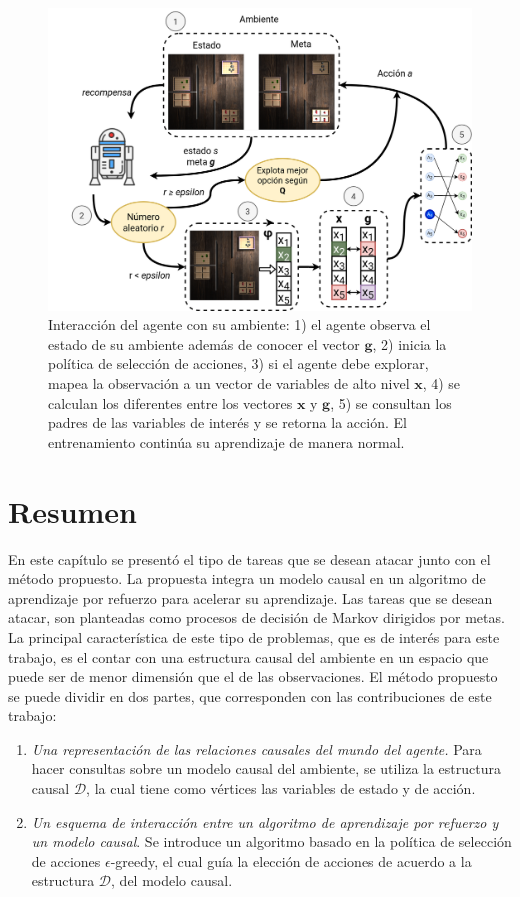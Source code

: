  \begin{figure}
     \centering
     \includegraphics[scale=0.25]{Chapter4/Figs/example_method.png}
     \caption{Interacción del agente con su ambiente: 1) el agente observa el estado de su ambiente además de conocer el vector $\mathbf{g}$, 2) inicia
     la política de selección de acciones, 3) si el agente debe explorar, mapea la observación a un vector de variables de alto nivel $\mathbf{x}$, 4) se calculan los diferentes entre los vectores $\mathbf{x}$ y $\mathbf{g}$, 5) se consultan los padres de las variables de interés y se retorna la acción. El entrenamiento continúa su aprendizaje de manera normal.}
     \label{fig:example-switches}
 \end{figure}
 
 \clearpage
 \section{Resumen}
 
En este capítulo se presentó el tipo de tareas que se 
desean atacar junto con el método propuesto. La propuesta
integra un modelo causal en un algoritmo de aprendizaje por refuerzo para
acelerar su aprendizaje.
Las tareas que se desean atacar, son 
planteadas como procesos de decisión de Markov dirigidos por metas.
La principal característica de este tipo de problemas, que es de interés para este trabajo,
es el contar con una estructura causal del ambiente en un espacio 
que puede ser de menor dimensión que el de las observaciones.
El método propuesto se puede dividir en dos partes, que
corresponden con las contribuciones de este trabajo:

\begin{enumerate}
    \item \textit{Una representación de las relaciones causales del mundo del agente.} Para hacer consultas sobre un modelo causal del ambiente, se utiliza la estructura causal $\mathcal{D}$, la cual tiene como vértices las variables de estado y de acción.
    \item  \textit{Un esquema de interacción entre un algoritmo de aprendizaje por refuerzo
    y un modelo causal}. Se introduce un algoritmo basado en la política de selección
    de acciones $\epsilon$-greedy, el cual guía la elección de acciones de acuerdo a la estructura $\mathcal{D}$, del modelo causal.
\end{enumerate}
